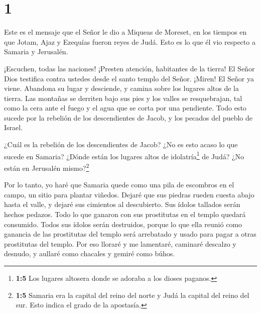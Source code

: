 \hypertarget{section}{%
\section{1}\label{section}}

 Este es el mensaje que el Señor le dio a Miqueas de
Moreset, en los tiempos en que Jotam, Ajaz y Ezequías fueron reyes de
Judá. Esto es lo que él vio respecto a Samaria y Jerusalén.

 ¡Escuchen, todas las naciones! ¡Presten atención,
habitantes de la tierra! El Señor Dios testifica contra ustedes desde el
santo templo del Señor.  ¡Miren! El Señor ya viene. Abandona
su lugar y desciende, y camina sobre los lugares altos de la tierra.
 Las montañas se derriten bajo sus pies y los valles se
resquebrajan, tal como la cera ante el fuego y el agua que se corta por
una pendiente. Todo esto sucede por la rebelión de los descendientes de
Jacob, y los pecados del pueblo de Israel.

 ¿Cuál es la rebelión de los descendientes de Jacob? ¿No es
esto acaso lo que sucede en Samaria? ¿Dónde están los lugares altos de
idolatría\footnote{\textbf{1:5} Los lugares altosera donde se adoraba a
  los dioses paganos.} de Judá? ¿No están en Jerusalén mismo?\footnote{\textbf{1:5}
  Samaria era la capital del reino del norte y Judá la capital del reino
  del sur. Esto indica el grado de la apostasía.}

 Por lo tanto, yo haré que Samaria quede como una pila de
escombros en el campo, un sitio para plantar viñedos. Dejaré que sus
piedras rueden cuesta abajo hasta el valle, y dejaré sus cimientos al
descubierto.  Sus ídolos tallados serán hechos pedazos. Todo
lo que ganaron con sus prostitutas en el templo quedará consumido. Todos
sus ídolos serán destruidos, porque lo que ella reunió como ganancia de
las prostitutas del templo será arrebatado y usado para pagar a otras
prostitutas del templo.  Por eso lloraré y me lamentaré,
caminaré descalzo y desnudo, y aullaré como chacales y gemiré como
búhos.

